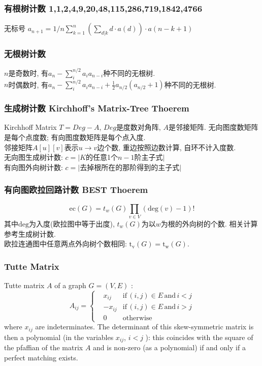\subsubsection{有根树计数 1,1,2,4,9,20,48,115,286,719,1842,4766}\noindent
无标号 $a_{n+1} = 1/n  \sum_{k=1}^{n} ( \sum_{d|k} d \cdot a(d) ) \cdot a(n-k+1)$ 
\subsubsection{无根树计数}\noindent
	$n$是奇数时, 有$a_n-\sum_{i}^{n/2}a_ia_{n-i}$种不同的无根树. \\
	$n$时偶数时, 有$a_n-\sum_{i}^{n/2}a_ia_{n-i}+\frac{1}{2}a_{n/2}(a_{n/2}+1)$种不同的无根树. 
\subsubsection{生成树计数 Kirchhoff's Matrix-Tree Thoerem}
	Kirchhoff Matrix $T=Deg-A$, $Deg$是度数对角阵, $A$是邻接矩阵. 无向图度数矩阵是每个点度数; 有向图度数矩阵是每个点入度.\\
	邻接矩阵$A[u][v]$表示$u\rightarrow v$边个数, 重边按照边数计算, 自环不计入度数.\\
	无向图生成树计数: $c=|K$的任意1个$n-1$阶主子式$|$\\
	有向图外向树计数: $c=|$去掉根所在的那阶得到的主子式$|$
\subsubsection{有向图欧拉回路计数 BEST Thoerem}
		\[ \mathrm{ec}(G) = t_w(G)\prod_{v \in{V}}(\mathrm{deg}(v) - 1)! \]
		其中$\mathrm{deg}$为入度(欧拉图中等于出度), $t_w(G)$为以$w$为根的外向树的个数. 相关计算参考生成树计数.\\
		欧拉连通图中任意两点外向树个数相同: $\mathrm{t_v}(G) = \mathrm{t_w}(G)$.
\subsubsection{Tutte Matrix}
	Tutte matrix $A$ of a graph $G=(V,E)$ : 
	\[A_{ij}=\left\{
		\begin{aligned}
			& x_{ij} & \text{if} \, (i,j)\in E \, \text{and}\, i<j \\
			& -x_{ij} & \text{if}\, (i,j)\in E \, \text{and}\, i>j \\
			& 0 & \text{otherwise}
		\end{aligned}
		\right.\]
	where $x_{ij}$ are indeterminates. The determinant of this skew-symmetric matrix is then a polynomial (in the variables $x_{ij}$, $i<j$ ): this coincides with the square of the pfaffian of the matrix $A$ and is non-zero (as a polynomial) if and only if a perfect matching exists.

